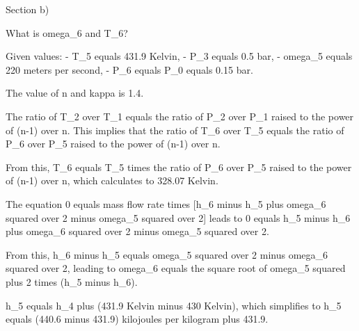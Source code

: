 Section b)

What is omega_6 and T_6?

Given values:
- T_5 equals 431.9 Kelvin,
- P_3 equals 0.5 bar,
- omega_5 equals 220 meters per second,
- P_6 equals P_0 equals 0.15 bar.

The value of n and kappa is 1.4.

The ratio of T_2 over T_1 equals the ratio of P_2 over P_1 raised to the power of (n-1) over n. This implies that the ratio of T_6 over T_5 equals the ratio of P_6 over P_5 raised to the power of (n-1) over n.

From this, T_6 equals T_5 times the ratio of P_6 over P_5 raised to the power of (n-1) over n, which calculates to 328.07 Kelvin.

The equation 0 equals mass flow rate times [h_6 minus h_5 plus omega_6 squared over 2 minus omega_5 squared over 2] leads to 0 equals h_5 minus h_6 plus omega_6 squared over 2 minus omega_5 squared over 2.

From this, h_6 minus h_5 equals omega_5 squared over 2 minus omega_6 squared over 2, leading to omega_6 equals the square root of omega_5 squared plus 2 times (h_5 minus h_6).

h_5 equals h_4 plus (431.9 Kelvin minus 430 Kelvin), which simplifies to h_5 equals (440.6 minus 431.9) kilojoules per kilogram plus 431.9.
